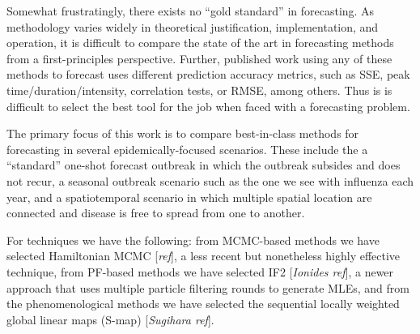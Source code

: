 Somewhat frustratingly, there exists no ``gold standard'' in forecasting. As methodology varies widely in theoretical justification, implementation, and operation, it is difficult to compare the state of the art in forecasting methods from a first-principles perspective. Further, published work using any of these methods to forecast uses different prediction accuracy metrics, such as SSE, peak time/duration/intensity, correlation tests, or RMSE, among others. Thus is is difficult to select the best tool for the job when faced with a forecasting problem.

The primary focus of this work is to compare best-in-class methods for forecasting in several epidemically-focused scenarios. These include the a ``standard'' one-shot forecast outbreak in which the outbreak subsides and does not recur, a seasonal outbreak scenario such as the one we see with influenza each year, and a spatiotemporal scenario in which multiple spatial location are connected and disease is free to spread from one to another.

For techniques we have the following: from MCMC-based methods we have selected Hamiltonian MCMC [\textit{ref}], a less recent but nonetheless highly effective technique, from PF-based methods we have selected IF2 [\textit{Ionides ref}], a newer approach that uses multiple particle filtering rounds to generate MLEs, and from the phenomenological methods we have selected the sequential locally weighted global linear maps (S-map) [\textit{Sugihara ref}].

